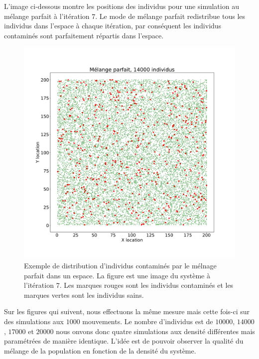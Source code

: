 L'image ci-dessous montre les positions des individus pour une simulation au mélange parfait à l'itération $7$. Le mode de mélange parfait redistribue tous les individus dans l'espace à chaque itération, par conséquent les individus contaminés sont parfaitement répartis dans l'espace.

\begin{figure}[h]
	\centering
	\captionsetup{justification=centering}
	\includegraphics[width=.7\textwidth]{Images/SI_positions_14k_mix.pdf}
	\caption[Positions des individus : mélange parfait]{Exemple de distribution d'individus contaminés par le mélnage parfait dans un espace. La figure est une image du système à l'itération $7$. Les marques rouges sont les individus contaminés et les marques vertes sont les individus sains.}
\end{figure}

\newpage

Sur les figures qui suivent, nous effectuons la même mesure mais cette fois-ci sur des simulations aux $1000$ mouvements. Le nombre d'individus est de $10000$, $14000$, $17000$ et $20000$ nous onvons donc quatre simulations aux densité différentes mais paramétrées de manière identique. L'idée est de pouvoir observer la qualité du mélange de la population en fonction de la densité du système.

